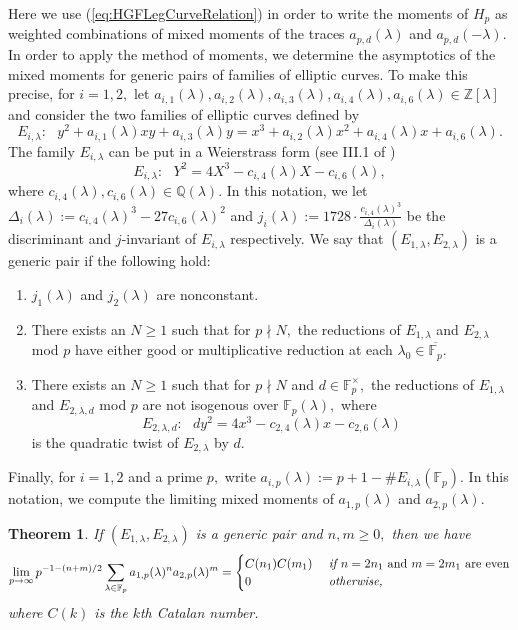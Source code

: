 \documentclass[12pt]{amsart}
\newtheorem{theorem}{Theorem}[section]
\theoremstyle{definition}
\theoremstyle{remark}
\numberwithin{equation}{section}
\def\F{{\mathbb F}}
\def\Z{{\mathbb Z}}
\def\Q{{\mathbb Q}}
\def\Z{\mathbb{Z}}
\def\Q{\mathbb{Q}}
\def\F{\mathbb{F}}
\begin{document}
Here we use (\ref{eq:HGFLegCurveRelation}) in order to write the moments of $H_p$ as weighted combinations of mixed moments of the traces $a_{p,d}(\lambda)$ and $a_{p,d}(-\lambda).$ In order to apply the method of moments, we determine the asymptotics of the mixed moments for generic pairs of families of elliptic curves. To make this precise, for $i=1,2,$ let $a_{i,1}(\lambda),a_{i,2}(\lambda),a_{i,3}(\lambda),a_{i,4}(\lambda),a_{i,6}(\lambda)\in\Z[\lambda]$ and consider the two families of elliptic curves defined by
$$
E_{i,\lambda}:\ \ \ y^2+a_{i,1}(\lambda)xy+a_{i,3}(\lambda)y=x^3+a_{i,2}(\lambda)x^2+a_{i,4}(\lambda)x+a_{i,6}(\lambda).
$$
The family $E_{i,\lambda}$ can be put in a Weierstrass form (see III.1 of \cite{SilvermanAEC})
$$
E_{i,\lambda}:\ \ \ Y^2 = 4X^3-c_{i,4}(\lambda)X-c_{i,6}(\lambda),
$$
where $c_{i,4}(\lambda),c_{i,6}(\lambda)\in\Q(\lambda).$ In this notation, we let $\Delta_i(\lambda):= c_{i,4}(\lambda)^3-27c_{i,6}(\lambda)^2$ and $j_i(\lambda):=1728\cdot\frac{c_{i,4}(\lambda)^3}{\Delta_i(\lambda)}$ be the discriminant and $j$-invariant of $E_{i,\lambda}$ respectively. We say that $(E_{1,\lambda},E_{2,\lambda})$ is a generic pair if the following hold:
\begin{enumerate}
    \item $j_1(\lambda)$ and $j_2(\lambda)$ are nonconstant.
    \item There exists an $N\geq 1$ such that for $p\nmid N,$ the reductions of $E_{1,\lambda}$ and $E_{2,\lambda}$ mod $p$ have either good or multiplicative reduction at each $\lambda_0\in\overline{\F_p}.$
    \item There exists an $N\geq 1$ such that for $p\nmid N$ and $d\in\F_p^\times,$ the reductions of $E_{1,\lambda}$ and $E_{2,\lambda,d}$ mod $p$ are not isogenous over $\F_p(\lambda),$ where
    $$
    E_{2,\lambda,d}:\ \ \ dy^2 = 4x^3-c_{2,4}(\lambda)x-c_{2,6}(\lambda)
    $$
    is the quadratic twist of $E_{2,\lambda}$ by $d.$
\end{enumerate}
Finally, for $i=1,2$ and a prime $p,$ write $a_{i,p}(\lambda):=p+1-\#E_{i,\lambda}(\F_p).$  In this notation, we compute the limiting mixed moments of $a_{1,p}(\lambda)$ and $a_{2,p}(\lambda).$

\begin{theorem}\label{theorem2}
    If $(E_{1,\lambda},E_{2,\lambda})$ is a generic pair and $n,m\geq 0,$ then we have
    $$
    \lim\limits_{p\to\infty} p^{-1-(n+m)/2}\sum\limits_{\lambda\in\F_p} a_{1,p}(\lambda)^na_{2,p}(\lambda)^m = \begin{cases}
    C(n_1)C(m_1) & \ \text{\it if } n=2n_1 \text{ and } m=2m_1 \text{ are even} \\
    0 & \ \text{\it otherwise,}
    \end{cases}
    $$
    where $C(k)$ is the $k$th Catalan number.
\end{theorem}
\end{document}
